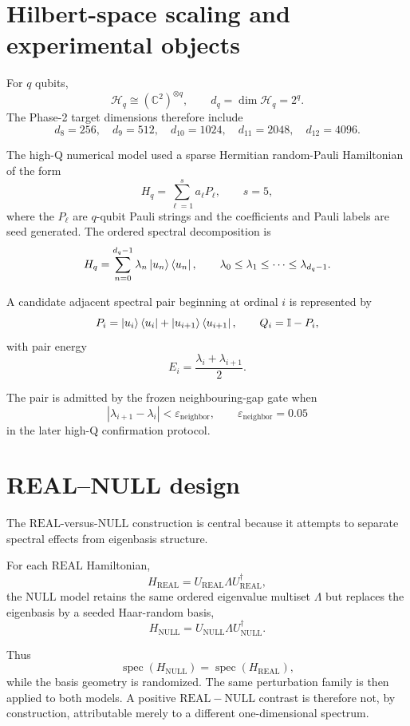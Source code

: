 \documentclass[11pt,a4paper]{article}
\newcommand{\Real}{\mathrm{REAL}}
\newcommand{\Null}{\mathrm{NULL}}
\newcommand{\cH}{\mathcal H}
\newcommand{\Id}{\mathbb I}
\newcommand{\eps}{\varepsilon}
\newcommand{\spec}{\operatorname{spec}}
\begin{document}
\section{Hilbert-space scaling and experimental objects}

For \(q\) qubits,
\[
\cH_q \cong (\mathbb C^2)^{\otimes q},
\qquad
d_q=\dim\cH_q=2^q.
\]
The Phase-2 target dimensions therefore include
\[
d_8=256,\quad
d_9=512,\quad
d_{10}=1024,\quad
d_{11}=2048,\quad
d_{12}=4096.
\]

The high-Q numerical model used a sparse Hermitian random-Pauli Hamiltonian
of the form
\[
H_q=\sum_{\ell=1}^{s} a_\ell P_\ell,
\qquad s=5,
\]
where the \(P_\ell\) are \(q\)-qubit Pauli strings and the coefficients and
Pauli labels are seed generated.  The ordered spectral decomposition is
\[
H_q=\sum_{n=0}^{d_q-1}\lambda_n\ket{u_n}\bra{u_n},
\qquad
\lambda_0\le\lambda_1\le\cdots\le\lambda_{d_q-1}.
\]

A candidate adjacent spectral pair beginning at ordinal \(i\) is represented
by
\[
P_i=\ket{u_i}\bra{u_i}+\ket{u_{i+1}}\bra{u_{i+1}},
\qquad
Q_i=\Id-P_i,
\]
with pair energy
\[
E_i=\frac{\lambda_i+\lambda_{i+1}}{2}.
\]

The pair is admitted by the frozen neighbouring-gap gate when
\[
|\lambda_{i+1}-\lambda_i|<\eps_{\mathrm{neighbor}},
\qquad
\eps_{\mathrm{neighbor}}=0.05
\]
in the later high-Q confirmation protocol.

\section{REAL--NULL design}

The \(\Real\)-versus-\(\Null\) construction is central because it attempts to
separate spectral effects from eigenbasis structure.

For each \(\Real\) Hamiltonian,
\[
H_{\Real}=U_{\Real}\Lambda U_{\Real}^\dagger,
\]
the \(\Null\) model retains the same ordered eigenvalue multiset
\(\Lambda\) but replaces the eigenbasis by a seeded Haar-random basis,
\[
H_{\Null}=U_{\Null}\Lambda U_{\Null}^\dagger.
\]

Thus
\[
\spec(H_{\Null})=\spec(H_{\Real}),
\]
while the basis geometry is randomized.  The same perturbation family is then
applied to both models.  A positive \(\Real-\Null\) contrast is therefore
not, by construction, attributable merely to a different one-dimensional
spectrum.
\end{document}
